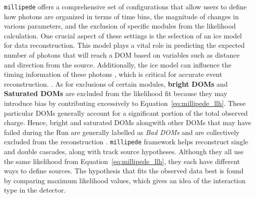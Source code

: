 \texttt{millipede} offers a comprehensive set of configurations that allow users to define how photons are organized in terms of time bins, the magnitude of changes in various parameters, and the exclusion of specific modules from the likelihood calculation. One crucial aspect of these settings is the selection of an ice model for data reconstruction. This model plays a vital role in predicting the expected number of photons that will reach a DOM based on variables such as distance and direction from the source. Additionally, the ice model can influence the timing information of these photons , which is critical for accurate event reconstruction. . As for exclusions of certain modules, \textbf{bright DOMs} and \textbf{Saturated DOMs} are excluded from the likelihood fit because they may introduce bias by contributing excessively to Equation~\ref{eq:millipede_llh}. These particular DOMs generally account for a significant portion of the total observed charge. Hence, bright and saturated DOMs alongwith other DOMs that may have failed during the Run are generally labelled as \emph{Bad DOMs} and are collectively excluded from the reconstruction 
. \texttt{millipede} framework helps reconstruct single and double cascades, along with track source hypotheses. Although they all use the same likelihood from Equation~\ref{eq:millipede_llh}, they each have different ways to define sources. The hypothesis that fits the observed data best is found by comparing maximum likelihood values, which gives an idea of the interaction type in the detector.

